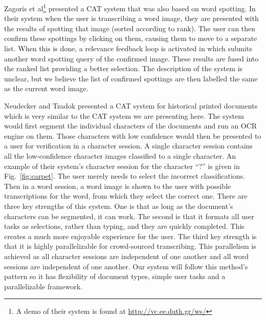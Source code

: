 \documentclass[ms]{byuprop}
\begin{document}
Zagoris et al\cite{Zagoris2015}\footnote{A demo of their system is found at \url{http://vc.ee.duth.gr/ws/}} presented a CAT system that was also based on word spotting. In their system when the user is transcribing a word image, they are presented with the results of spotting that image (sorted according to rank). The user can then confirm these spottings by clicking on them, causing them to move to a separate list. When this is done, a relevance feedback loop is activated in which submits another word spotting query of the confirmed image. These results are fused into the ranked list providing a better selection. The description of the system is unclear, but we believe the list of confirmed spottings are then labelled the same as the current word image.

Neudecker and Tzadok\cite{Neudecker2010} presented a CAT system for historical printed documents which is very similar to the CAT system we are presenting here. The system would first segment the individual characters of the documents and run an OCR engine on them. Those characters with low confidence would then be presented to a user for verification in a character session. A single character session contains all the low-confidence character images classified to a single character. An example of their system's character session for the character ``?'' is given in Fig.~\ref{fig:carpet}.  The user merely needs to select the incorrect classifications. Then in a word session, a word image is shown to the user with possible transcriptions for the word, from which they select the correct one. There are three key strengths of this system. One is that as long as the document’s characters can be segmented, it can work. The second is that it formats all user tasks as selections, rather than typing, and they are quickly completed. This creates a much more enjoyable experience for the user. The third key strength is that it is highly parallelizable for crowd-sourced transcribing. This parallelism is achieved as all character sessions are independent of one another and all word sessions are independent of one another. Our system will follow this method's pattern so it has flexibility of document types, simple user tasks and a parallelizable framework.
\end{document}
